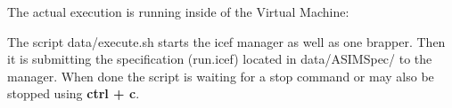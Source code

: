 The actual execution is running inside of the Virtual Machine:

The script data/execute.sh starts the icef manager as well as one brapper. Then it is submitting the specification (run.icef) located in data/ASIMSpec/ to the manager. When done the script is waiting for a stop command or may also be stopped using \textbf{ctrl + c}.

